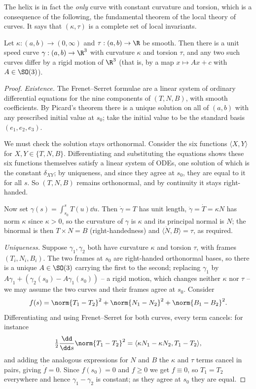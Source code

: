 The helix is in fact the \emph{only} curve with constant curvature and torsion, which is a consequence of the following, the fundamental theorem of the local theory of curves. It says that $(\kappa, \tau)$ is a complete set of local invariants.

\begin{theorem}
    Let $\kappa: (a,b) \rightarrow (0, \infty)$ and $\tau : (a,b) \rightarrow \R$ be smooth. Then there is a unit speed curve $\gamma: (a,b) \rightarrow \R^3$ with curvature $\kappa$ and torsion $\tau$, and any two such curves differ by a rigid motion of $\R^3$ (that is, by a map $x \mapsto Ax + c$ with $A \in \SO(3)$).
\end{theorem}
\begin{proof}
    \emph{Existence.} The Frenet--Serret formulae are a linear system of ordinary differential equations for the nine components of $(T, N, B)$, with smooth coefficients. By Picard's theorem there is a unique solution on all of $(a,b)$ with any prescribed initial value at $s_0$; take the initial value to be the standard basis $(e_1, e_2, e_3)$.

    We must check the solution stays orthonormal. Consider the six functions $\langle X, Y\rangle$ for $X, Y \in \{T, N, B\}$. Differentiating and substituting the equations shows these six functions themselves satisfy a linear system of ODEs, one solution of which is the constant $\delta_{XY}$; by uniqueness, and since they agree at $s_0$, they are equal to it for all $s$. So $(T,N,B)$ remains orthonormal, and by continuity it stays right-handed.

    Now set $\gamma(s) = \int_{s_0}^s T(u) \dd u$. Then $\dot\gamma = T$ has unit length, $\ddot\gamma = \dot T = \kappa N$ has norm $\kappa$ since $\kappa > 0$, so the curvature of $\gamma$ is $\kappa$ and its principal normal is $N$; the binormal is then $T \times N = B$ (right-handedness) and $\langle \dot N, B\rangle = \tau$, as required.

    \emph{Uniqueness.} Suppose $\gamma_1, \gamma_2$ both have curvature $\kappa$ and torsion $\tau$, with frames $(T_i, N_i, B_i)$. The two frames at $s_0$ are right-handed orthonormal bases, so there is a unique $A \in \SO(3)$ carrying the first to the second; replacing $\gamma_1$ by $A\gamma_1 + (\gamma_2(s_0) - A\gamma_1(s_0))$ -- a rigid motion, which changes neither $\kappa$ nor $\tau$ -- we may assume the two curves and their frames agree at $s_0$. Consider
    $$
    f(s) = \norm{T_1 - T_2}^2 + \norm{N_1 - N_2}^2 + \norm{B_1-B_2}^2.
    $$
    Differentiating and using Frenet--Serret for both curves, every term cancels: for instance
    $$
    \tfrac{1}{2}\frac{\dd}{\dd s}\norm{T_1-T_2}^2 = \langle \kappa N_1 - \kappa N_2, T_1 - T_2\rangle,
    $$
    and adding the analogous expressions for $N$ and $B$ the $\kappa$ and $\tau$ terms cancel in pairs, giving $\dot f = 0$. Since $f(s_0) = 0$ and $f \geq 0$ we get $f \equiv 0$, so $T_1 = T_2$ everywhere and hence $\gamma_1 - \gamma_2$ is constant; as they agree at $s_0$ they are equal.
\end{proof}


